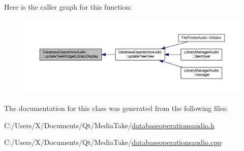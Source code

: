 Here is the caller graph for this function\-:
\nopagebreak
\begin{figure}[H]
\begin{center}
\leavevmode
\includegraphics[width=350pt]{class_database_operations_audio_a663fb07afd5d0c4c0b0de23fd2c19ad1_icgraph}
\end{center}
\end{figure}




The documentation for this class was generated from the following files\-:\begin{DoxyCompactItemize}
\item 
C\-:/\-Users/\-X/\-Documents/\-Qt/\-Media\-Take/\hyperlink{databaseoperationsaudio_8h}{databaseoperationsaudio.\-h}\item 
C\-:/\-Users/\-X/\-Documents/\-Qt/\-Media\-Take/\hyperlink{databaseoperationsaudio_8cpp}{databaseoperationsaudio.\-cpp}\end{DoxyCompactItemize}
